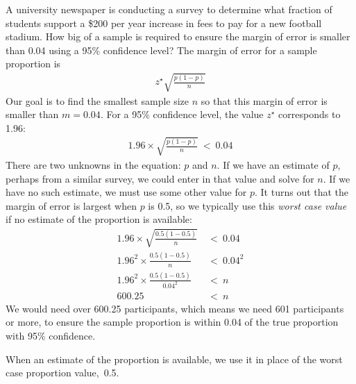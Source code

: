 \begin{example}{A university newspaper is conducting a survey to determine what fraction of students support a \$200 per year increase in fees to pay for a new football stadium. How big of a sample is required to ensure the margin of error is smaller than 0.04 using a 95\% confidence level?}
The margin of error for a sample proportion is
\begin{align*}
z^{\star} \sqrt{\frac{p (1 - p)}{n}}
\end{align*}
Our goal is to find the smallest sample size $n$ so that this margin of error is smaller than $m=0.04$. For a 95\% confidence level, the value $z^{\star}$ corresponds to 1.96:
\begin{align*}
1.96\times \sqrt{\frac{p(1-p)}{n}} \ < \ 0.04
\end{align*}
There are two unknowns in the equation: $p$ and $n$. If we have an estimate of $p$, perhaps from a similar survey, we could enter in that value and solve for $n$. If we have no such estimate, we must use some other value for $p$. It turns out that the margin of error is largest when $p$ is 0.5, so we typically use this \emph{worst case value} if no estimate of the proportion is available:
\begin{align*}
	1.96\times \sqrt{\frac{0.5(1-0.5)}{n}} &\ < \ 0.04 \\
	1.96^2\times \frac{0.5(1-0.5)}{n} &\ < \ 0.04^2 \\
	1.96^2\times \frac{0.5(1-0.5)}{0.04^2} &\ < \ n \\
	600.25 &\ < \  n
\end{align*}
We would need over 600.25 participants, which means we need 601 participants or more, to ensure the sample proportion is within 0.04 of the true proportion with 95\% confidence.
\end{example}

When an estimate of the proportion is available, we use it in place of the worst case proportion value,~0.5.

